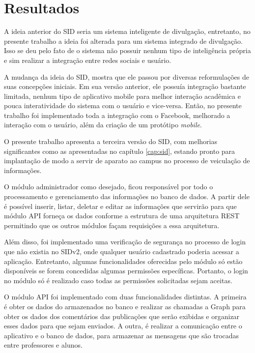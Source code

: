 \chapter[Resultados]{Resultados}
A ideia anterior do SID seria um sistema inteligente de divulgação, entretanto, no presente trabalho a ideia foi alterada para um sistema integrado de divulgação. Isso se deu pelo fato de o sistema não possuir nenhum tipo de inteligência própria e sim realizar a integração entre redes sociais e usuário.

A mudança da ideia do SID, mostra que ele passou por diversas reformulações de suas concepções iniciais. Em sua versão anterior, ele possuía integração bastante limitada, nenhum tipo de aplicativo mobile para melhor interação acadêmica e pouca interatividade do sistema com o usuário e vice-versa. Então, no presente trabalho foi implementado toda a integração com o Facebook, melhorado a interação com o usuário, além da criação de um protótipo \textit{mobile}.

O presente trabalho apresenta a terceira versão do SID, com melhorias significantes como as apresentadas no capítulo \ref{cap:sid}, estando pronto para implantação de modo a servir de aparato ao campus no processo de veiculação de informações.

O módulo administrador como desejado, ficou responsável por todo o processamento e gerenciamento das informações no banco de dados. A partir dele é possível inserir, listar, deletar e editar as informações que servirão para que módulo API forneça os dados conforme a estrutura de uma arquitetura REST permitindo que os outros módulos façam requisições a essa arquitetura.

Além disso, foi implementado uma verificação de segurança no processo de login que não existia no SIDv2, onde qualquer usuário cadastrado poderia acessar a aplicação. Entretanto, algumas funcionalidades oferecidas pelo módulo só estão disponíveis se forem concedidas algumas permissões específicas. Portanto, o login no módulo só é realizado caso todas as permissões solicitadas sejam aceitas.

O módulo API foi implementado com duas funcionalidades distintas. A primeira é obter os dados do armazenados no banco e realizar as chamadas a Graph para obter os dados dos comentários das publicações que serão exibidas e organizar esses dados para que sejam enviados. A outra, é realizar a comunicação entre o aplicativo e o banco de dados, para armazenar as mensagens que são trocadas entre professores e alunos.

